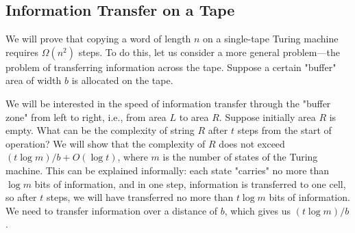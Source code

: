 \documentclass[12pt,sans]{article}
\theoremstyle{definition}
\theoremstyle{plain}
\theoremstyle{remark}
\begin{document}
\subsection{Information Transfer on a Tape}
We will prove that copying a word of length $n$ on a single-tape Turing machine requires $\Omega(n^2)$ steps. To do this, let us consider a more general problem—the problem of transferring information across the tape. Suppose a certain "buffer" area of width $b$ is allocated on the tape.
\begin{center}
\end{center}
We will be interested in the speed of information transfer through the "buffer zone" from left to right, i.e., from area $L$ to area $R$. Suppose initially area $R$ is empty. What can be the complexity of string $R$ after $t$ steps from the start of operation? We will show that the complexity of $R$ does not exceed $(t\log m)/b + O(\log t)$, where $m$ is the number of states of the Turing machine. This can be explained informally: each state "carries" no more than $\log m$ bits of information, and in one step, information is transferred to one cell, so after $t$ steps, we will have transferred no more than $t\log m$ bits of information. We need to transfer information over a distance of $b$, which gives us $(t\log m) / b$.
\end{document}
